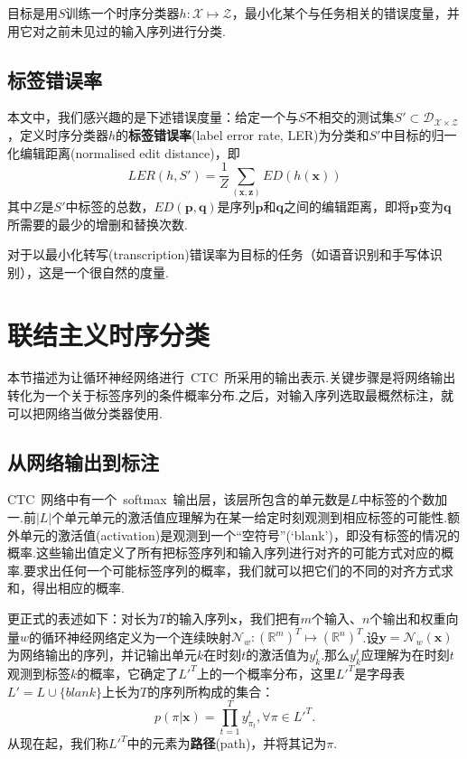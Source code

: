 \documentclass{ctexart}
\def\bR{\mathbb{R}}
\def\cD{\mathcal{D}}
\def\cN{\mathcal{N}}
\def\cX{\mathcal{X}}
\def\cZ{\mathcal{Z}}
\def\vx{\mathbf{x}}
\def\vy{\mathbf{y}}
\def\vz{\mathbf{z}}
\def\vp{\mathbf{p}}
\def\vq{\mathbf{q}}
\begin{document}
目标是用$S$训练一个时序分类器$h:\cX\mapsto\cZ$，最小化某个与任务相关的错误度量，并用它对之前未见过的输入序列进行分类.
\subsection{标签错误率}
\label{sec:ler}
本文中，我们感兴趣的是下述错误度量：给定一个与$S$不相交的测试集$S'\subset\cD_{\cX\times\cZ}$，定义时序分类器$h$的\textbf{标签错误率}(label error rate, LER)为分类和$S'$中目标的归一化编辑距离(normalised edit distance)，即
\begin{equation}
	\textit{LER}(h, S') = \frac 1Z \sum_{(\vx, \vz)} \textit{ED}(h(\vx))
\end{equation}
其中$Z$是$S'$中标签的总数，$\textit{ED}(\vp,\vq)$是序列$\vp$和$\vq$之间的编辑距离，即将$\vp$变为$\vq$所需要的最少的增删和替换次数.

对于以最小化转写(transcription)错误率为目标的任务（如语音识别和手写体识别），这是一个很自然的度量.
\section{联结主义时序分类}
\label{sec:ctc}
本节描述为让循环神经网络进行~CTC~所采用的输出表示.关键步骤是将网络输出转化为一个关于标签序列的条件概率分布.之后，对输入序列选取最概然标注，就可以把网络当做分类器使用.
\subsection{从网络输出到标注}
CTC~网络中有一个~softmax~输出层\citep{bridle1990probabilistic}，该层所包含的单元数是$L$中标签的个数加一.前$|L|$个单元单元的激活值应理解为在某一给定时刻观测到相应标签的可能性.额外单元的激活值(activation)是观测到一个“空符号”(`blank')，即没有标签的情况的概率.这些输出值定义了所有把标签序列和输入序列进行对齐的可能方式对应的概率.要求出任何一个可能标签序列的概率，我们就可以把它们的不同的对齐方式求和，得出相应的概率.

更正式的表述如下：对长为$T$的输入序列$\vx$，我们把有$m$个输入、$n$个输出和权重向量$w$的循环神经网络定义为一个连续映射$\cN_w:(\bR^m)^T\mapsto (\bR^n)^T$.设$\vy = \cN_w(\vx)$为网络输出的序列，并记输出单元$k$在时刻$t$的激活值为$y_k^t$.那么$y_k^t$应理解为在时刻$t$观测到标签$k$的概率，它确定了$L'^T$上的一个概率分布，这里$L'^T$是字母表$L'=L\cup\{\textit{blank}\}$上长为$T$的序列所构成的集合：
\begin{equation}
	\label{eq:2}
	p(\pi|\vx) = \prod_{t=1}^{T} y_{\pi_t}^t, \forall\pi\in L'^T.
\end{equation}
从现在起，我们称$L'^T$中的元素为\textbf{路径}(path)，并将其记为$\pi$.
\end{document}

